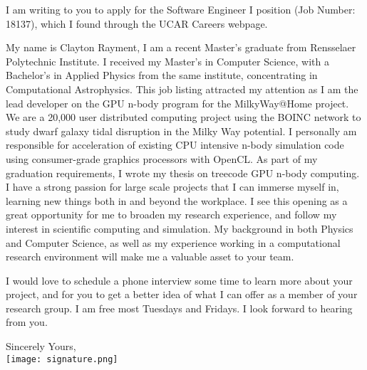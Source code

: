 \documentclass[10pt,stdletter,dateno,sigleft]{newlfm} %
\begin{document}
\begin{newlfm}


I am writing to you to apply for the Software Engineer I position (Job Number: 18137), which I found through the UCAR Careers webpage. 

My name is Clayton Rayment, I am a recent Master's graduate from Rensselaer Polytechnic Institute. I received my Master's in Computer Science, with a Bachelor's in Applied Physics from the same institute, concentrating in Computational Astrophysics. This job listing attracted my attention as I am the lead developer on the GPU n-body program for the MilkyWay@Home project. We are a 20,000 user distributed computing project using the BOINC network to study dwarf galaxy tidal disruption in the Milky Way potential. I personally am responsible for acceleration of existing CPU intensive n-body simulation code using consumer-grade graphics processors with OpenCL. As part of my graduation requirements, I wrote my thesis on treecode GPU n-body computing. I have a strong passion for large scale projects that I can immerse myself in, learning new things both in and beyond the workplace. I see this opening as a great opportunity for me to broaden my research experience, and follow my interest in scientific computing and simulation. My background in both Physics and Computer Science, as well as my experience working in a computational research environment will make me a valuable asset to your team.

I would love to schedule a phone interview some time to learn more about your project, and for you to get a better idea of what I can offer as a member of your research group. I am free most Tuesdays and Fridays. I look forward to hearing from you.

Sincerely Yours,\vspace{15pt}\\
\texttt{[image: signature.png]}\vspace{-20pt}\\


\end{newlfm}
\end{document}
